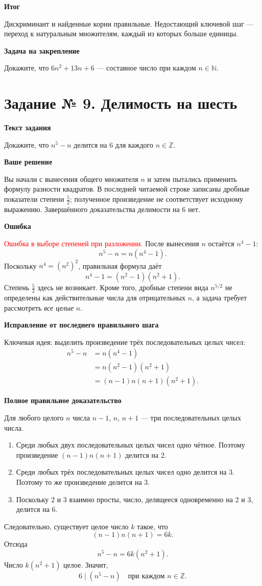\documentclass[12pt,a4paper]{article}
\newcommand{\parthead}[1]{\par\medskip\textbf{#1}\par\smallskip}
\begin{document}
\parthead{\textcolor{teal!60!black}{Итог}}
Дискриминант и найденные корни правильные. Недостающий ключевой шаг --- переход к натуральным множителям, каждый из которых больше единицы.

\parthead{Задача на закрепление}
Докажите, что $6n^2+13n+6$ --- составное число при каждом $n\in\mathbb N$.

\clearpage
{}\label{task:9}
\section*{Задание № 9. Делимость на шесть}
\parthead{Текст задания}
Докажите, что $n^5-n$ делится на $6$ для каждого $n\in\mathbb Z$.

\parthead{Ваше решение}
Вы начали с вынесения общего множителя $n$ и затем пытались применить формулу разности квадратов. В последней читаемой строке записаны дробные показатели степени $\frac52$; полученное произведение не соответствует исходному выражению. Завершённого доказательства делимости на $6$ нет.

\parthead{Ошибка}
\textcolor{red}{Ошибка в выборе степеней при разложении.}
После вынесения $n$ остаётся $n^4-1$:
\[
n^5-n=n(n^4-1).
\]
Поскольку $n^4=(n^2)^2$, правильная формула даёт
\[
n^4-1=(n^2-1)(n^2+1).
\]
Степень $\frac52$ здесь не возникает. Кроме того, дробные степени вида $n^{5/2}$ не определены как действительные числа для отрицательных $n$, а задача требует рассмотреть \emph{все целые} $n$.

\parthead{Исправление от последнего правильного шага}
\textcolor{blue!60!black}{Ключевая идея:} выделить произведение трёх последовательных целых чисел:
\[
\begin{aligned}
n^5-n
&=n(n^4-1)\\
&=n(n^2-1)(n^2+1)\\
&=(n-1)n(n+1)(n^2+1).
\end{aligned}
\]

\parthead{Полное правильное доказательство}
Для любого целого $n$ числа $n-1$, $n$, $n+1$ --- три последовательных целых числа.

\begin{enumerate}
\item Среди любых двух последовательных целых чисел одно чётное. Поэтому произведение $(n-1)n(n+1)$ делится на $2$.
\item Среди любых трёх последовательных целых чисел одно делится на $3$. Поэтому то же произведение делится на $3$.
\item Поскольку $2$ и $3$ взаимно просты, число, делящееся одновременно на $2$ и $3$, делится на $6$.
\end{enumerate}
Следовательно, существует целое число $k$ такое, что
\[
(n-1)n(n+1)=6k.
\]
Отсюда
\[
n^5-n=6k(n^2+1).
\]
Число $k(n^2+1)$ целое. Значит,
\[
\boxed{6\mid(n^5-n)\quad\text{при каждом }n\in\mathbb Z.}
\]
\end{document}
